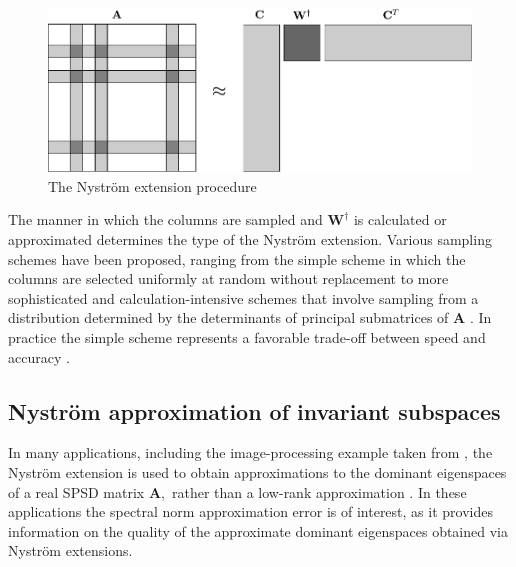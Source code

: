 \documentclass[11pt,letterpaper,twoside,reqno,nosumlimits]{amsart}
\def\pinv{\dagger}
\newcommand{\mat}[1]{\ensuremath{\mathbf{#1}}}
\theoremstyle{remark}
\begin{document}
\begin{figure}[h]
 \centering
 \includegraphics[scale=.75]{nystrom-procedure.pdf}
 \caption{The Nystr\"om extension procedure}
 \label{fig:nystromprocedure}
\end{figure}

The manner in which the columns are sampled and $\mat{W}^\pinv$ is calculated or approximated determines the type of the Nystr\"om extension. Various sampling schemes have been proposed, ranging from the simple scheme in which the columns are selected uniformly at random without replacement to more sophisticated and calculation-intensive schemes that involve sampling from a distribution determined by the determinants of principal submatrices of $\mat{A}$ \cite{BW09}. In practice the simple scheme represents a favorable trade-off between speed and accuracy \cite{KMT09}.
  
\subsection{Nystr\"om approximation of invariant subspaces}
In many applications, including the image-processing example taken from \cite{BCFM04}, the Nystr\"om extension is used to obtain approximations to the dominant eigenspaces of a real SPSD matrix $\mat{A},$ rather than a low-rank approximation \cite{homrighausen11}. In these applications the spectral norm approximation error is of interest, as it provides information on the quality of the approximate dominant eigenspaces obtained via Nystr\"om extensions. 
\end{document}
